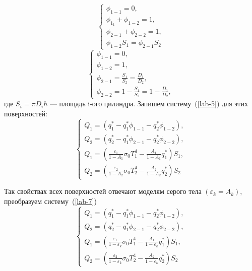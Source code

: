 \documentclass[12pt, a4paper]{article}
\begin{document}
\begin{equation*}
	\begin{cases}
		\phi_{1-1} = 0, \\
		\phi_{1_1} + \phi_{1-2} = 1, \\
		\phi_{2-1} + \phi_{2-2} = 1, \\
		\phi_{1-2} S_1 = \phi_{2-1} S_2
	\end{cases}
\end{equation*}
\begin{equation}
	\label{lab-6}
	\begin{cases}
		\phi_{1-1} = 0, \\
		\phi_{1-2} = 1, \\
		\phi_{2-1} = \frac{S_1}{S_2} = \frac{D_1}{D_2}, \\
		\phi_{2-2} = 1 - \frac{S_1}{S_2} = 1 - \frac{D_1}{D_2},
	\end{cases}
\end{equation}
где $S_i = \pi D_i h$ --- площадь i-ого цилиндра.
Запишем систему~(\ref{lab-5}) для этих поверхностей:
\begin{equation}
	\label{lab-7}
	\begin{cases}
		Q_1 = \left(q_1^{*} - q_1^{*} \phi_{1-1} - q_2^{*} \phi_{1-2}\right), \\
		Q_2 = \left(q_2^{*} - q_1^{*} \phi_{2-1} - q^{*}_2 \phi_{2-2}\right), \\
		Q_1 = \left(\frac{\varepsilon_1}{1 - A_1}\sigma_0T_1^4  - \frac{A_1}{1- A_1}q_1^{*}\right)S_1, \\
		Q_2 = \left(\frac{\varepsilon_2}{1- A_2} \sigma_0 T_2^4 - \frac{A_2}{1- A_2}q_2^{*}\right)S_2
	\end{cases}
\end{equation}

Так свойствах всех поверхностей отвечают моделям серого тела $\left(\varepsilon_k = A_k\right)$, преобразуем систему~(\ref{lab-7})
\begin{equation}
	\label{lab-8}
	\begin{cases}
		Q_1 = \left(q_1^{*} - q_1^{*} \phi_{1-1} - q_2^{*} \phi_{1-2}\right), \\
		Q_2 = \left(q_2^{*} - q_1^{*} \phi_{2-1} - q^{*}_2 \phi_{2-2}\right), \\
		Q_1 = \left(\frac{\varepsilon_1}{1 - \varepsilon_k}\sigma_0T_1^4  - \frac{A_1}{1- \varepsilon_k}q_1^{*}\right)S_1, \\
		Q_2 = \left(\frac{\varepsilon_2}{1- \varepsilon_k} \sigma_0 T_2^4 - \frac{A_2}{1- \varepsilon_k}q_2^{*}\right)S_2
	\end{cases}
\end{equation}
\end{document}
